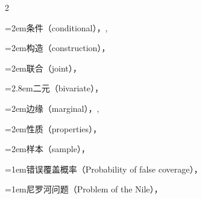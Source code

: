 \begin{multicols}{2}
\par\noindent\hangindent=2em\hspace*{1em}\label{idx:851}条件（conditional），\hyperref[def:4.2.1]{\pageref*{def:4.2.1}}, \hyperref[eq:4.6.6]{\pageref*{eq:4.6.6}}\par
\par\noindent\hangindent=2em\hspace*{1em}\label{idx:852}构造（construction），\hyperref[idxocc:852:61]{\pageref*{idxocc:852:61}}\par
\par\noindent\hangindent=2em\hspace*{1em}\label{idx:853}联合（joint），\hyperref[eq:4.6.1]{\pageref*{eq:4.6.1}}\par
\par\noindent\hangindent=2.8em\hspace*{1.8em}\label{idx:854}二元（bivariate），\hyperref[def:4.1.3]{\pageref*{def:4.1.3}}\par
\par\noindent\hangindent=2em\hspace*{1em}\label{idx:855}边缘（marginal），\hyperref[thm:4.1.6]{\pageref*{thm:4.1.6}}, \hyperref[idxocc:855:176]{\pageref*{idxocc:855:176}}\par
\par\noindent\hangindent=2em\hspace*{1em}\label{idx:856}性质（properties），\hyperref[thm:1.6.5]{\pageref*{thm:1.6.5}}\par
\par\noindent\hangindent=2em\hspace*{1em}\label{idx:857}样本（sample），\hyperref[eq:5.1.1]{\pageref*{eq:5.1.1}}\par
\par\addvspace{2pt}
\par\noindent\hangindent=1em\hspace*{0em}\label{idx:858}错误覆盖概率（Probability of false coverage），\hyperref[eq:9.3.2]{\pageref*{eq:9.3.2}}\par
\par\addvspace{2pt}
\par\noindent\hangindent=1em\hspace*{0em}\label{idx:859}尼罗河问题（Problem of the Nile），\hyperref[exercise:7.54]{\pageref*{exercise:7.54}}\par
\par\addvspace{2pt}

\end{multicols}
